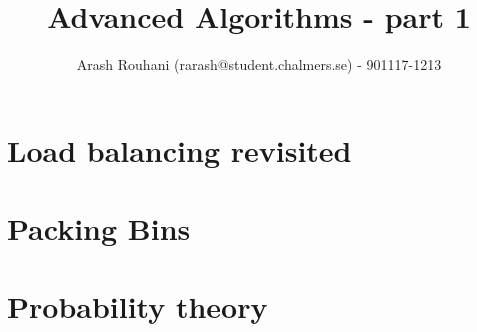 \documentclass[a4paper,11pt]{article}
\title{Advanced Algorithms - part 1}
\author{Arash Rouhani (rarash@student.chalmers.se) - 901117-1213}
\begin{document}
\maketitle

\section{Load balancing revisited}

\section{Packing Bins}

\section{Probability theory}
\end{document}
